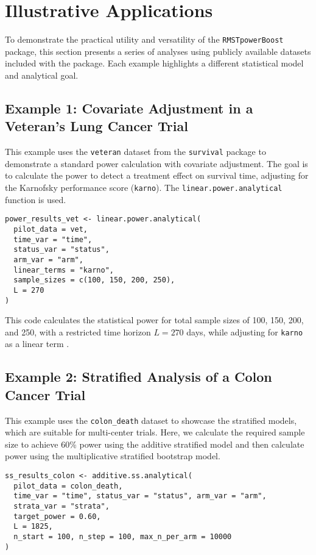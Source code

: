 \documentclass[11pt, a4paper]{article}
\begin{document}
\section{Illustrative Applications}
To demonstrate the practical utility and versatility of the \texttt{RMSTpowerBoost} package, this section presents a series of analyses using publicly available datasets included with the package. Each example highlights a different statistical model and analytical goal.

\subsection{Example 1: Covariate Adjustment in a Veteran's Lung Cancer Trial}
This example uses the \texttt{veteran} dataset from the \texttt{survival} package to demonstrate a standard power calculation with covariate adjustment. The goal is to calculate the power to detect a treatment effect on survival time, adjusting for the Karnofsky performance score (\texttt{karno}). The \texttt{linear.power.analytical} function is used.

\begin{lstlisting}
power_results_vet <- linear.power.analytical(
  pilot_data = vet,
  time_var = "time",
  status_var = "status",
  arm_var = "arm",
  linear_terms = "karno",
  sample_sizes = c(100, 150, 200, 250),
  L = 270
)
\end{lstlisting}

This code calculates the statistical power for total sample sizes of 100, 150, 200, and 250, with a restricted time horizon $L=270$ days, while adjusting for \texttt{karno} as a linear term \cite{[1]}.

\subsection{Example 2: Stratified Analysis of a Colon Cancer Trial}
This example uses the \texttt{colon\_death} dataset to showcase the stratified models, which are suitable for multi-center trials. Here, we calculate the required sample size to achieve 60\% power using the additive stratified model and then calculate power using the multiplicative stratified bootstrap model.

\begin{lstlisting}
ss_results_colon <- additive.ss.analytical(
  pilot_data = colon_death,
  time_var = "time", status_var = "status", arm_var = "arm", 
  strata_var = "strata",
  target_power = 0.60,
  L = 1825,
  n_start = 100, n_step = 100, max_n_per_arm = 10000
)
\end{lstlisting}
\end{document}
